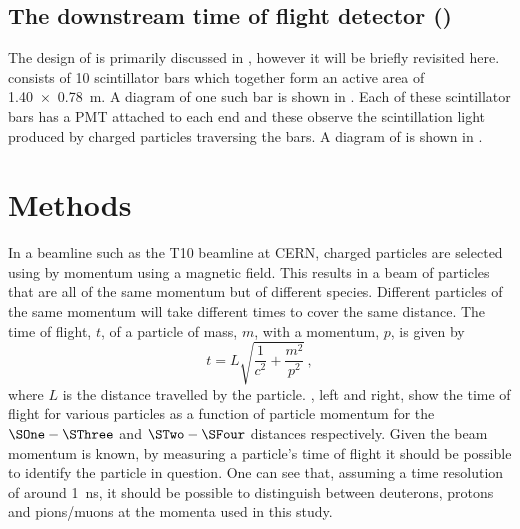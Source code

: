 \subsection{The downstream time of flight detector (\SFour)}
\label{sec:hptpc_beam_flux:overview:s4}

The design of \SFour is primarily discussed in , however it will be briefly revisited here.
\SFour consists of 10 scintillator bars which together form an active area of \SI{1.40 x 0.78}{\metre}.
A diagram of one such bar is shown in .
Each of these scintillator bars has a PMT attached to each end and these observe the scintillation light produced by charged particles traversing the bars.
A diagram of \SFour is shown in .

\section{Methods}
\label{sec:hptpc_beam_flux:methods}

In a beamline such as the T10 beamline at CERN, charged particles are selected using by momentum using a magnetic field.
This results in a beam of particles that are all of the same momentum but of different species.
Different particles of the same momentum will take different times to cover the same distance.
The time of flight, $t$, of a particle of mass, $m$, with a momentum, $p$, is given by
\begin{equation}
t = L \sqrt{ \frac{1}{c^{2}} + \frac{m^{2}}{p^{2}} }\, ,
\end{equation}
where $L$ is the distance travelled by the particle.
, left and right, show the time of flight for various particles as a function of particle momentum for the $\SOne - \SThree$ and  $\STwo - \SFour$ distances respectively.
Given the beam momentum is known, by measuring a particle's time of flight it should be possible to identify the particle in question.
One can see that, assuming a time resolution of around \SI{1}{\nano\second}, it should be possible to distinguish between deuterons, protons and pions/muons at the momenta used in this study.

